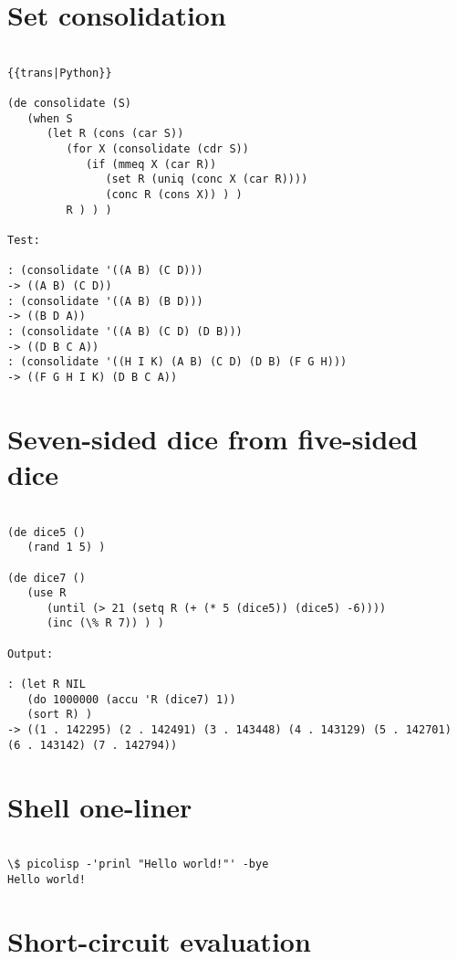 \section*{Set consolidation}

\begin{verbatim}

{{trans|Python}}

(de consolidate (S)
   (when S
      (let R (cons (car S))
         (for X (consolidate (cdr S))
            (if (mmeq X (car R))
               (set R (uniq (conc X (car R))))
               (conc R (cons X)) ) )
         R ) ) )

Test:

: (consolidate '((A B) (C D)))
-> ((A B) (C D))
: (consolidate '((A B) (B D)))
-> ((B D A))
: (consolidate '((A B) (C D) (D B)))
-> ((D B C A))
: (consolidate '((H I K) (A B) (C D) (D B) (F G H)))
-> ((F G H I K) (D B C A))

\end{verbatim}

\section*{Seven-sided dice from five-sided dice}

\begin{verbatim}

(de dice5 ()
   (rand 1 5) )

(de dice7 ()
   (use R
      (until (> 21 (setq R (+ (* 5 (dice5)) (dice5) -6))))
      (inc (\% R 7)) ) )

Output:

: (let R NIL
   (do 1000000 (accu 'R (dice7) 1))
   (sort R) )
-> ((1 . 142295) (2 . 142491) (3 . 143448) (4 . 143129) (5 . 142701) (6 . 143142) (7 . 142794))

\end{verbatim}

\section*{Shell one-liner}

\begin{verbatim}

\$ picolisp -'prinl "Hello world!"' -bye
Hello world!

\end{verbatim}

\section*{Short-circuit evaluation}

